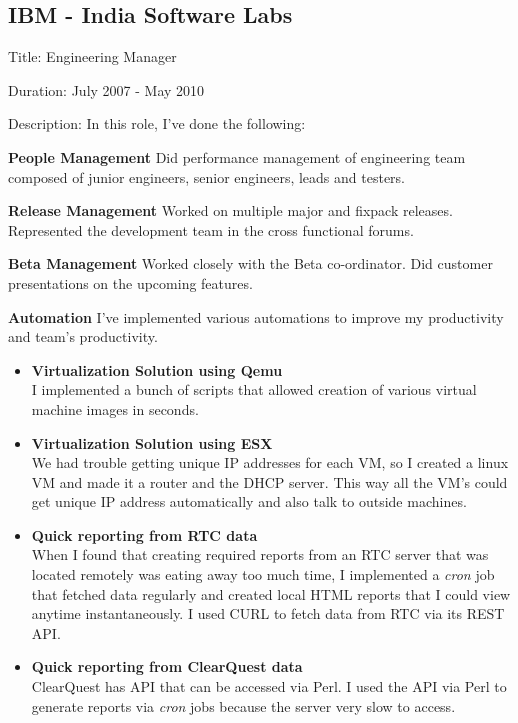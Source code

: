 \documentclass [a4paper,11pt] {article}
\begin{document}
\subsection*{IBM - India Software Labs}
\begin{description}
\item{Title:} Engineering Manager
\item{Duration:} July 2007 - May 2010
\item{Description:} In this role, I've done the following:
	    \begin{description}
	    \item{\bf People Management} Did performance management of engineering team composed of junior engineers, senior engineers, leads and testers.
	    \item{\bf Release Management} Worked on multiple major and fixpack releases. Represented the development team in the cross functional forums.
	    \item{\bf Beta Management} Worked closely with the Beta co-ordinator. Did customer presentations on the upcoming features.
	    \item{\bf Automation} I've implemented various automations to improve my productivity and team's productivity.
	    	\begin{itemize}
		\item{\bf Virtualization Solution using Qemu}\\I implemented a bunch of scripts that allowed creation of various virtual machine images in seconds.
		\item{\bf Virtualization Solution using ESX}\\We had trouble
		getting unique IP addresses for each VM, so I created a linux
		VM and made it a router and the DHCP server. This way all the
		VM's could get unique IP address automatically and also talk to
		outside machines. 
		\item{\bf Quick reporting from RTC data}\\
		When I found that creating required reports from an RTC server
		that was located remotely was eating away too much time, I
		implemented a {\it cron} job that fetched data regularly and created
		local HTML reports that I could view anytime instantaneously. I
		used CURL to fetch data from RTC via its REST API.
		\item{\bf Quick reporting from ClearQuest data}\\
			ClearQuest has API that can be accessed via Perl. I
			used the API via Perl to generate reports via {\it cron} jobs
			because the server very slow to access.
		\end{itemize}
	    \end{description}

\end{description}
\end{document}
